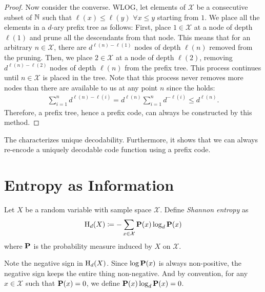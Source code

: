 \documentclass[a4paper]{article}
\begin{document}
\begin{proof}
	Now consider the converse.
	WLOG, let elements of $\mathcal{X}$ be a consecutive subset of $\mathbb{N}$ such that $\ell(x)\leq\ell(y)$ $\forall x\leq y$ starting from $1$.
	We place all the elements in a $d$-ary prefix tree as follows:
	First, place $1\in\mathcal{X}$ at a node of depth $\ell(1)$ and prune all the descendants from that node.
	This means that for an arbitrary $n\in\mathcal{X}$,
	there are $d^{\ell(n)-\ell(1)}$ nodes of depth $\ell(n)$ removed from the pruning.
	Then, we place $2\in\mathcal{X}$ at a node of depth $\ell(2)$,
	removing $d^{\ell(n)-\ell(2)}$ nodes of depth $\ell(n)$ from the prefix tree.
	This process continues until $n\in\mathcal{X}$ is placed in the tree.
	Note that this process never removes more nodes than there are available to us at any point $n$
	since the  holds:
	\begin{align*}
		\sum_{i=1}^{n} d^{\ell(n)-\ell(i)}
		= d^{\ell(n)} \sum_{i=1}^{n} d^{-\ell(i)}
		\leq d^{\ell(n)}.
	\end{align*}
	Therefore, a prefix tree, hence a prefix code, can always be constructed by this method.
\end{proof}

\begin{remark}
	The  characterizes unique decodability.
	Furthermore, it shows that we can always re-encode a uniquely decodable code function using a prefix code.
\end{remark}

\section{Entropy as Information}

\begin{definition}
	Let $X$ be a random variable with sample space $\mathcal{X}$.
	Define \emph{Shannon entropy} as
	\begin{equation*}
		\mathrm{H}_d(X) \coloneqq -\sum_{x\in\mathcal{X}} \operatorname{\text{\textrm{\upshape\textbf{P}}}}(x) \log_d\operatorname{\text{\textrm{\upshape\textbf{P}}}}(x)
	\end{equation*}
	where $\operatorname{\text{\textrm{\upshape\textbf{P}}}}$ is the probability measure induced by $X$ on $\mathcal{X}$.
\end{definition}

\begin{remark}
	Note the negative sign in $\mathrm{H}_d(X)$.
	Since $\log\operatorname{\text{\textrm{\upshape\textbf{P}}}}(x)$ is always non-positive, the negative sign keeps the entire thing non-negative.
	And by convention, for any $x\in\mathcal{X}$ such that $\operatorname{\text{\textrm{\upshape\textbf{P}}}}(x)=0$, we define $\operatorname{\text{\textrm{\upshape\textbf{P}}}}(x)\log_d\operatorname{\text{\textrm{\upshape\textbf{P}}}}(x)=0$.
\end{remark}
\end{document}
